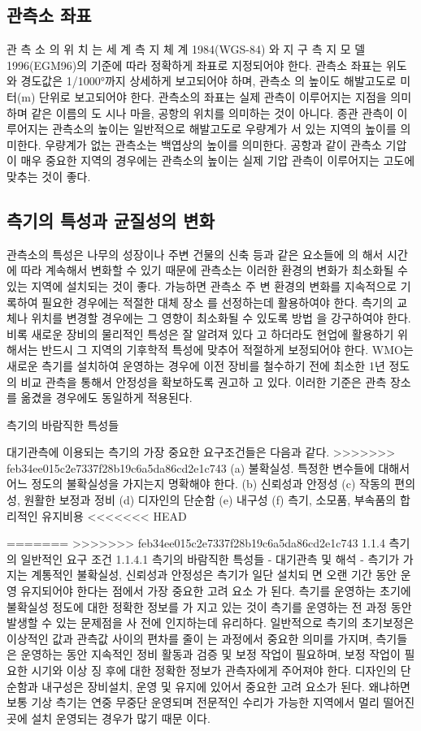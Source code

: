 \subsection{관측소 좌표}
관 측 소 의 위 치 는 세 계 측 지 체 계 1984(WGS-84) 와 지 구 측 지 모 델
1996(EGM96)의 기준에 따라 정확하게 좌표로 지정되어야 한다. 관측소
좌표는 위도와 경도값은 1/1000°까지 상세하게 보고되어야 하며, 관측소
의 높이도 해발고도로 미터(m) 단위로 보고되어야 한다.
관측소의 좌표는 실제 관측이 이루어지는 지점을 의미하며 같은 이름의 도
시나 마을, 공항의 위치를 의미하는 것이 아니다. 종관 관측이 이루어지는
관측소의 높이는 일반적으로 해발고도로 우량계가 서 있는 지역의 높이를
의미한다. 우량계가 없는 관측소는 백엽상의 높이를 의미한다. 공항과 같이
관측소 기압이 매우 중요한 지역의 경우에는 관측소의 높이는 실제 기압
관측이 이루어지는 고도에 맞추는 것이 좋다.

\subsection{측기의 특성과 균질성의 변화}
관측소의 특성은 나무의 성장이나 주변 건물의 신축 등과 같은 요소들에 의
해서 시간에 따라 계속해서 변화할 수 있기 때문에 관측소는 이러한 환경의
변화가 최소화될 수 있는 지역에 설치되는 것이 좋다. 가능하면 관측소 주
변 환경의 변화를 지속적으로 기록하여 필요한 경우에는 적절한 대체 장소
를 선정하는데 활용하여야 한다.
측기의 교체나 위치를 변경할 경우에는 그 영향이 최소화될 수 있도록 방법
을 강구하여야 한다. 비록 새로운 장비의 물리적인 특성은 잘 알려져 있다
고 하더라도 현업에 활용하기 위해서는 반드시 그 지역의 기후학적 특성에
맞추어 적절하게 보정되어야 한다.
WMO는 새로운 측기를 설치하여 운영하는 경우에 이전 장비를 철수하기
전에 최소한 1년 정도의 비교 관측을 통해서 안정성을 확보하도록 권고하
고 있다. 이러한 기준은 관측 장소를 옮겼을 경우에도 동일하게 적용된다.

측기의 바람직한 특성들

대기관측에 이용되는 측기의 가장 중요한 요구조건들은 다음과 같다.
>>>>>>> feb34ee015c2e7337f28b19c6a5da86cd2e1c743
(a) 불확실성. 특정한 변수들에 대해서 어느 정도의 불확실성을 가지는지
명확해야 한다.
(b) 신뢰성과 안정성
(c) 작동의 편의성, 원활한 보정과 정비
(d) 디자인의 단순함
(e) 내구성
(f) 측기, 소모품, 부속품의 합리적인 유지비용
<<<<<<< HEAD


=======
>>>>>>> feb34ee015c2e7337f28b19c6a5da86cd2e1c743
1.1.4 측기의 일반적인 요구 조건
1.1.4.1 측기의 바람직한 특성들
- 대기관측 및 해석
-
측기가 가지는 계통적인 불확실성, 신뢰성과 안정성은 측기가 일단 설치되
면 오랜 기간 동안 운영 유지되어야 한다는 점에서 가장 중요한 고려 요소
가 된다. 측기를 운영하는 초기에 불확실성 정도에 대한 정확한 정보를 가
지고 있는 것이 측기를 운영하는 전 과정 동안 발생할 수 있는 문제점을 사
전에 인지하는데 유리하다.
일반적으로 측기의 초기보정은 이상적인 값과 관측값 사이의 편차를 줄이
는 과정에서 중요한 의미를 가지며, 측기들은 운영하는 동안 지속적인 정비
활동과 검증 및 보정 작업이 필요하며, 보정 작업이 필요한 시기와 이상 징
후에 대한 정확한 정보가 관측자에게 주어져야 한다.
디자인의 단순함과 내구성은 장비설치, 운영 및 유지에 있어서 중요한 고려
요소가 된다. 왜냐하면 보통 기상 측기는 연중 무중단 운영되며 전문적인
수리가 가능한 지역에서 멀리 떨어진 곳에 설치 운영되는 경우가 많기 때문
이다.

